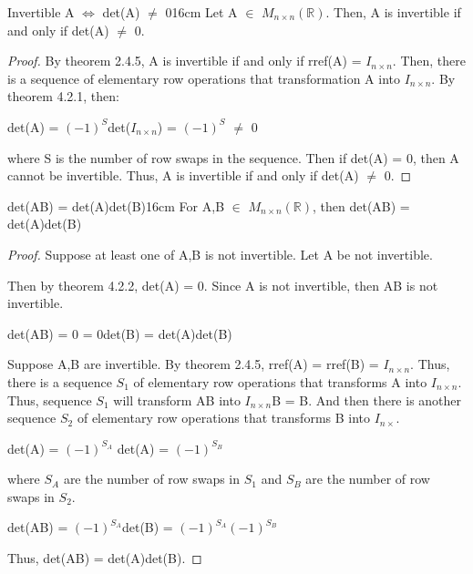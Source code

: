     \vspace{0.5cm}



    \begin{wtheorem}{Invertible A $\Leftrightarrow$ det(A) $\not =$ 0}{16cm}
        Let A $\in$ $M_{n \times n}(\mathbb{R})$.
        Then, A is invertible if and only if det(A) $\not =$ 0.
    \end{wtheorem}

    \begin{proof}
        By {\color{red} theorem 2.4.5}, A is invertible if and only if
        rref(A) = $I_{n \times n}$.
        Then, there is a sequence of elementary row operations that
        transformation A into $I_{n \times n}$.
        By {\color{red} theorem 4.2.1}, then:

        \hspace{0.5cm}
        det(A) = $(-1)^S$det($I_{n \times n}$) = $(-1)^S$ $\not =$ 0

        where S is the number of row swaps in the sequence.
        Then if det(A) = 0, then A cannot be invertible.
        Thus, A is invertible if and only if det(A) $\not =$ 0.
    \end{proof}

    \newpage



    \begin{wtheorem}{det(AB) = det(A)det(B)}{16cm}
        For A,B $\in$ $M_{n \times n}(\mathbb{R})$, then
        det(AB) = det(A)det(B)
    \end{wtheorem}

    \begin{proof}
        Suppose at least one of A,B is not invertible.
        Let A be not invertible.

        Then by {\color{red} theorem 4.2.2}, det(A) = 0.
        Since A is not invertible, then AB is not invertible.

        \hspace{0.5cm}
        det(AB) = 0 = 0det(B) = det(A)det(B)

        Suppose A,B are invertible. By {\color{red} theorem 2.4.5},
        rref(A) = rref(B) = $I_{n \times n}$.
        Thus, there is a sequence $S_1$ of elementary row operations
        that transforms A into $I_{n \times n}$.
        Thus, sequence $S_1$ will transform AB into $I_{n \times n}$B = B.
        And then there is another sequence $S_2$
        of elementary row operations that transforms B into $I_{n \times}$.
    
        \hspace{0.5cm}
        det(A) = $(-1)^{S_A}$
        \hspace{1cm}
        det(A) = $(-1)^{S_B}$

        where $S_A$ are the number of row swaps in $S_1$
        and $S_B$ are the number of row swaps in $S_2$.

        \hspace{0.5cm}
        det(AB) = $(-1)^{S_A}$det(B) = $(-1)^{S_A} (-1)^{S_B}$

        Thus, det(AB) = det(A)det(B).
    \end{proof}

